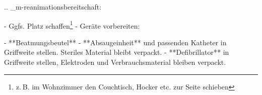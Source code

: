 
.. _m-reanimationsbereitschaft:


\begin{enumerate}
  -   Ggfs. Platz schaffen\footnote{z. B. im Wohnzimmer den Couchtisch, Hocker etc. zur Seite schieben}
  -   Geräte vorbereiten:
\begin{enumerate}
    -   **Beatmungsbeutel**
    -   **Absaugeinheit** und passenden Katheter  in
    Griffweite stellen. Steriles Material bleibt verpackt.
    -   **Defibrillator** in Griffweite stellen,
    Elektroden und Verbrauchsmaterial bleiben verpackt.
  \end{enumerate}
\end{enumerate}